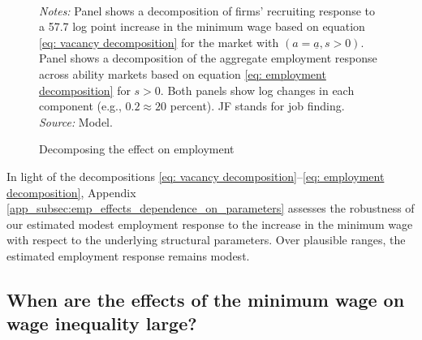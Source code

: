\begin{figure}[!htb]
  \centering
  \caption{Decomposing the effect on employment\label{figure: impact of minimum wage on employment}}
  \prefigvspace
  \\
  \postfigvspace
  \begin{minipage}[t]{1\columnwidth}%
    \begin{spacing}{0.75}
      {\scriptsize \textit{Notes:} Panel  shows a decomposition of firms' recruiting response to a 57.7 log point increase in the minimum wage based on equation \eqref{eq: vacancy decomposition} for the market with $(a=\underline{a},s>0)$. Panel  shows a decomposition of the aggregate employment response across ability markets based on equation \eqref{eq: employment decomposition} for $s > 0$. Both panels show log changes in each component (e.g., $0.2 \approx 20$ percent). JF stands for job finding. %
      \textit{Source:} Model.}
    \end{spacing}
  \end{minipage}
\end{figure}

In light of the decompositions \eqref{eq: vacancy decomposition}--\eqref{eq: employment decomposition}, Appendix \ref{app_subsec:emp_effects_dependence_on_parameters} assesses the robustness of our estimated modest employment response to the increase in the minimum wage with respect to the underlying structural parameters. Over plausible ranges, the estimated employment response remains modest.


\subsection{When are the effects of the minimum wage on wage inequality large?\label{subsec:comparative_statics}}

